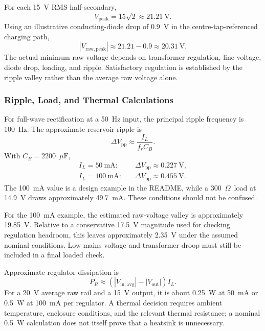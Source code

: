 \documentclass[11pt,a4paper]{article}
\newcommand{\ohm}{\ensuremath{\Omega}}
\newcommand{\uF}{\ensuremath{\mu\mathrm{F}}}
\begin{document}
For each 15~V RMS half-secondary,
\begin{equation}
V_{\mathrm{peak}}=15\sqrt{2}\approx21.21~\mathrm{V}.
\end{equation}
Using an illustrative conducting-diode drop of 0.9~V in the centre-tap-referenced charging path,
\begin{equation}
|V_{\mathrm{raw,peak}}|\approx21.21-0.9\approx20.31~\mathrm{V}.
\end{equation}
The actual minimum raw voltage depends on transformer regulation, line voltage, diode drop, loading, and ripple. Satisfactory regulation is established by the ripple valley rather than the average raw voltage alone.

\subsubsection{Ripple, Load, and Thermal Calculations}
For full-wave rectification at a 50~Hz input, the principal ripple frequency is 100~Hz. The approximate reservoir ripple is
\begin{equation}
\Delta V_{\mathrm{pp}}\approx\frac{I_L}{f_rC_B}.
\end{equation}
With $C_B=2200$~\uF,
\begin{align}
I_L=50~\mathrm{mA}:\quad &\Delta V_{\mathrm{pp}}\approx0.227~\mathrm{V},\\
I_L=100~\mathrm{mA}:\quad &\Delta V_{\mathrm{pp}}\approx0.455~\mathrm{V}.
\end{align}
The 100~mA value is a design example in the README, while a 300~\ohm\ load at 14.9~V draws approximately 49.7~mA. These conditions should not be confused.

For the 100~mA example, the estimated raw-voltage valley is approximately 19.85~V. Relative to a conservative 17.5~V magnitude used for checking regulation headroom, this leaves approximately 2.35~V under the assumed nominal conditions. Low mains voltage and transformer droop must still be included in a final loaded check.

Approximate regulator dissipation is
\begin{equation}
P_R\approx\left(|V_{\mathrm{in,avg}}|-|V_{\mathrm{out}}|\right)I_L.
\end{equation}
For a 20~V average raw rail and a 15~V output, it is about 0.25~W at 50~mA or 0.5~W at 100~mA per regulator. A thermal decision requires ambient temperature, enclosure conditions, and the relevant thermal resistance; a nominal 0.5~W calculation does not itself prove that a heatsink is unnecessary.
\end{document}
